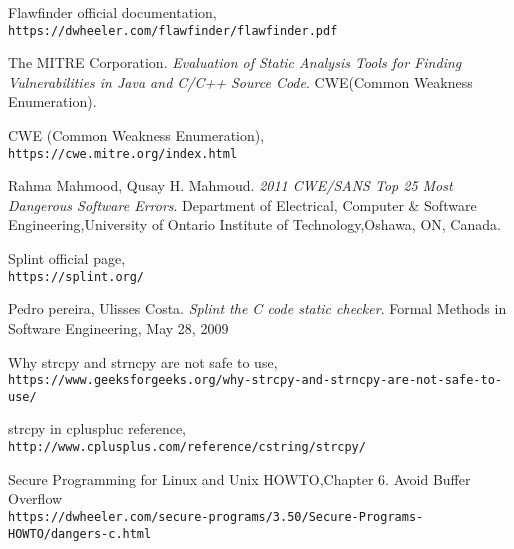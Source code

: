 \documentclass[a4paper,12pt]{article}
\begin{document}
\begin{thebibliography}{}

   Flawfinder official documentation,\\\texttt{https://dwheeler.com/flawfinder/flawfinder.pdf}

The MITRE Corporation.
\textit{Evaluation of Static Analysis Tools for Finding Vulnerabilities in Java and C/C++
Source Code}.
CWE(Common
Weakness Enumeration)\cite{CWE}.

  CWE (Common
Weakness Enumeration),\\\texttt{https://cwe.mitre.org/index.html}

  
Rahma Mahmood, Qusay H. Mahmoud.
\textit{2011 CWE/SANS Top 25 Most Dangerous Software Errors}.
Department of Electrical, Computer \& Software Engineering,University of Ontario Institute of Technology,Oshawa, ON, Canada.

 Splint official page,\\\texttt{https://splint.org/}    

Pedro pereira, Ulisses Costa.
\textit{Splint the C code static checker}.
Formal Methods in Software Engineering, May 28, 2009

Why strcpy and strncpy are not safe to use,\\\texttt{https://www.geeksforgeeks.org/why-strcpy-and-strncpy-are-not-safe-to-use/}


strcpy in cpluspluc reference,\\\texttt{http://www.cplusplus.com/reference/cstring/strcpy/}

Secure Programming for Linux and Unix HOWTO,Chapter 6. Avoid Buffer Overflow\\\texttt{https://dwheeler.com/secure-programs/3.50/Secure-Programs-HOWTO/dangers-c.html}

\end{thebibliography}
\end{document}
